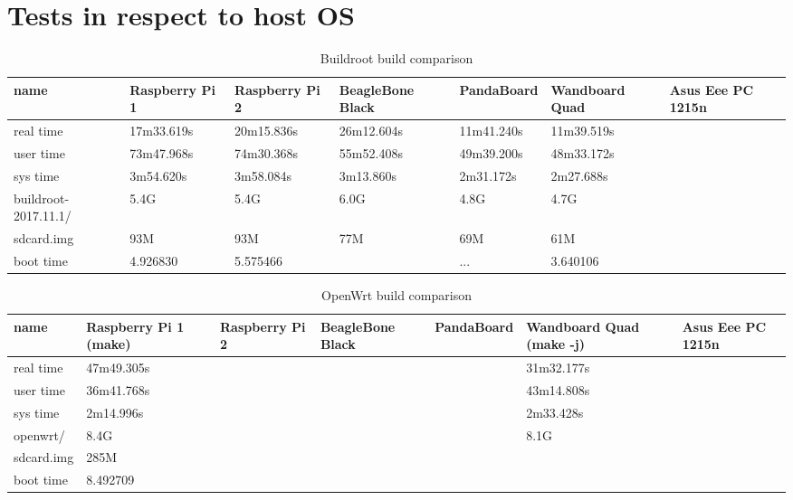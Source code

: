 \documentclass[printmode]{mgr}
\begin{document}
\section{Tests in respect to host OS}

\begin{landscape}



\begin{table}
  \begin{tabular}{| p{2.5cm} | p{3cm} | p{3cm} | p{3cm} | p{3cm} | p{3cm} | p{3cm} |}
    \hline
    name & Raspberry Pi 1 & Raspberry Pi 2 & BeagleBone Black & PandaBoard & Wandboard Quad & Asus Eee PC 1215n \\
    \hline
    real time & 17m33.619s & 20m15.836s & 26m12.604s & 11m41.240s & 11m39.519s &  \\
    \hline
    user time & 73m47.968s & 74m30.368s & 55m52.408s & 49m39.200s & 48m33.172s &  \\
    \hline
    sys time & 3m54.620s & 3m58.084s & 3m13.860s & 2m31.172s & 2m27.688s &  \\
    \hline
    buildroot-2017.11.1/ & 5.4G & 5.4G & 6.0G & 4.8G & 4.7G & \\
    \hline
    sdcard.img & 93M & 93M & 77M & 69M & 61M & \\
    \hline
    boot time & 4.926830 & 5.575466 & & ... & 3.640106 & \\
    \hline
  \end{tabular}
  \caption{Buildroot build comparison}
\end{table}


\begin{table}
  \begin{tabular}{| p{2.5cm} | p{3cm} | p{3cm} | p{3cm} | p{3cm} | p{3cm} | p{3cm} |}
    \hline
    name & Raspberry Pi 1 (make) & Raspberry Pi 2 & BeagleBone Black & PandaBoard & Wandboard Quad (make -j) & Asus Eee PC 1215n \\
    \hline
    real time & 47m49.305s &  &  &  & 31m32.177s &  \\
    \hline
    user time & 36m41.768s &  &  &  & 43m14.808s &  \\
    \hline
    sys time & 2m14.996s &  &  &  & 2m33.428s &  \\
    \hline
    openwrt/ & 8.4G &  &  &  & 8.1G &  \\
    \hline
    sdcard.img & 285M &  &  &  &  &  \\
    \hline
    boot time & 8.492709 &  &  &  &  &  \\
    \hline
  \end{tabular}
  \caption{OpenWrt build comparison}
\end{table}





\end{landscape}
\end{document}
